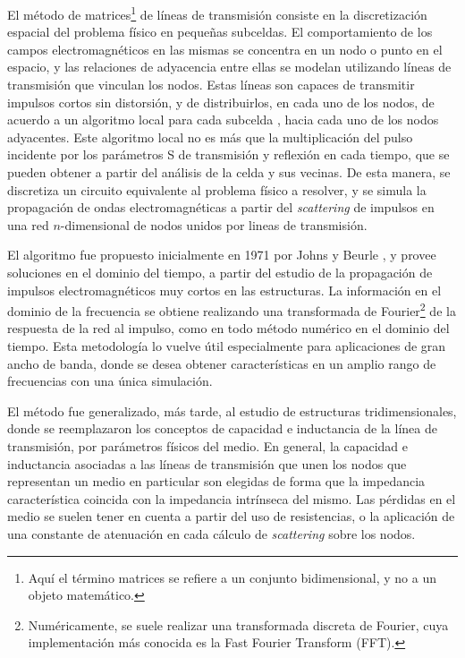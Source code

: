 El método de matrices\footnote{Aquí el término matrices se refiere a un conjunto bidimensional, y no a un objeto matemático.} de líneas de transmisión consiste en la discretización espacial del problema físico en pequeñas subceldas. El comportamiento de los campos electromagnéticos en las mismas se concentra en un nodo o punto en el espacio, y las relaciones de adyacencia entre ellas se modelan utilizando líneas de transmisión que vinculan los nodos. Estas líneas son capaces de transmitir impulsos cortos sin distorsión, y de distribuirlos, en cada uno de los nodos, de acuerdo a un algoritmo local para cada subcelda \cite{Caloz:ElectromagneticMetamaterials}, hacia cada uno de los nodos adyacentes. Este algoritmo local no es más que la multiplicación del pulso incidente por los parámetros S de transmisión y reflexión en cada tiempo, que se pueden obtener a partir del análisis de la celda y sus vecinas. De esta manera, se discretiza un circuito equivalente al problema físico a resolver, y se simula la propagación de ondas electromagnéticas a partir del \textit{scattering} de impulsos en una red $n$-dimensional de nodos unidos por lineas de transmisión.

El algoritmo fue propuesto inicialmente en 1971 por Johns y Beurle \cite{JohnsBeurle:TLM}, y provee soluciones en el dominio del tiempo, a partir del estudio de la propagación de impulsos electromagnéticos muy cortos en las estructuras. La información en el dominio de la frecuencia se obtiene realizando una transformada de Fourier\footnote{Numéricamente, se suele realizar una transformada discreta de Fourier, cuya implementación más conocida es la Fast Fourier Transform (FFT).} de la respuesta de la red al impulso, como en todo método numérico en el dominio del tiempo. Esta metodología lo vuelve útil especialmente para aplicaciones de gran ancho de banda, donde se desea obtener características en un amplio rango de frecuencias con una única simulación.

El método fue generalizado, más tarde, al estudio de estructuras tridimensionales, donde se reemplazaron los conceptos de capacidad e inductancia de la línea de transmisión, por parámetros físicos del medio. En general, la capacidad e inductancia asociadas a las líneas de transmisión que unen los nodos que representan un medio en particular son elegidas de forma que la impedancia característica coincida con la impedancia intrínseca del mismo. Las pérdidas en el medio se suelen tener en cuenta a partir del uso de resistencias, o la aplicación de una constante de atenuación en cada cálculo de \textit{scattering} sobre los nodos.



